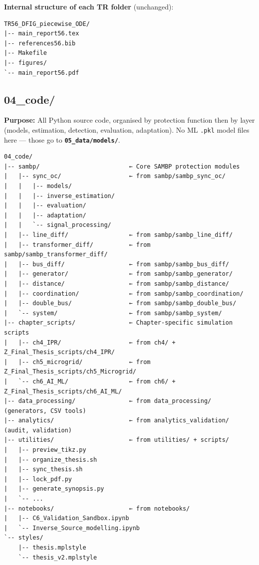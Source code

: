 \documentclass[11pt,a4paper]{article}
\newcommand{\dir}[1]{\texttt{\textbf{#1}}}
\begin{document}
\textbf{Internal structure of each TR folder} (unchanged):
\begin{verbatim}
TR56_DFIG_piecewise_ODE/
|-- main_report56.tex
|-- references56.bib
|-- Makefile
|-- figures/
`-- main_report56.pdf
\end{verbatim}

\subsection{04\_code/}

\begin{greenbox}
\textbf{Purpose:} All Python source code, organised by protection function
then by layer (models, estimation, detection, evaluation, adaptation).
No ML \texttt{.pkl} model files here — those go to \dir{05\_data/models/}.
\end{greenbox}

\begin{verbatim}
04_code/
|-- sambp/                         ← Core SAMBP protection modules
|   |-- sync_oc/                   ← from sambp/sambp_sync_oc/
|   |   |-- models/
|   |   |-- inverse_estimation/
|   |   |-- evaluation/
|   |   |-- adaptation/
|   |   `-- signal_processing/
|   |-- line_diff/                 ← from sambp/sambp_line_diff/
|   |-- transformer_diff/          ← from sambp/sambp_transformer_diff/
|   |-- bus_diff/                  ← from sambp/sambp_bus_diff/
|   |-- generator/                 ← from sambp/sambp_generator/
|   |-- distance/                  ← from sambp/sambp_distance/
|   |-- coordination/              ← from sambp/sambp_coordination/
|   |-- double_bus/                ← from sambp/sambp_double_bus/
|   `-- system/                    ← from sambp/sambp_system/
|-- chapter_scripts/               ← Chapter-specific simulation scripts
|   |-- ch4_IPR/                   ← from ch4/ + Z_Final_Thesis_scripts/ch4_IPR/
|   |-- ch5_microgrid/             ← from Z_Final_Thesis_scripts/ch5_Microgrid/
|   `-- ch6_AI_ML/                 ← from ch6/ + Z_Final_Thesis_scripts/ch6_AI_ML/
|-- data_processing/               ← from data_processing/ (generators, CSV tools)
|-- analytics/                     ← from analytics_validation/ (audit, validation)
|-- utilities/                     ← from utilities/ + scripts/
|   |-- preview_tikz.py
|   |-- organize_thesis.sh
|   |-- sync_thesis.sh
|   |-- lock_pdf.py
|   |-- generate_synopsis.py
|   `-- ...
|-- notebooks/                     ← from notebooks/
|   |-- C6_Validation_Sandbox.ipynb
|   `-- Inverse_Source_modelling.ipynb
`-- styles/
    |-- thesis.mplstyle
    `-- thesis_v2.mplstyle
\end{verbatim}
\end{document}
